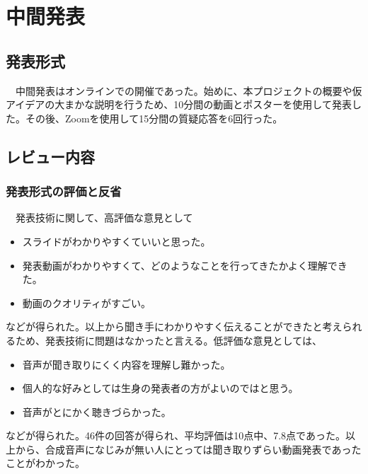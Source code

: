 \chapter{中間発表}

\section{発表形式}
　中間発表はオンラインでの開催であった。始めに、本プロジェクトの概要や仮アイデアの大まかな説明を行うため、10分間の動画とポスターを使用して発表した。その後、Zoomを使用して15分間の質疑応答を6回行った。

\section{レビュー内容}
\subsection{発表形式の評価と反省}
　発表技術に関して、高評価な意見として
\begin{itemize}
    \item スライドがわかりやすくていいと思った。
    \item 発表動画がわかりやすくて、どのようなことを行ってきたかよく理解できた。
    \item 動画のクオリティがすごい。
\end{itemize}
などが得られた。以上から聞き手にわかりやすく伝えることができたと考えられるため、発表技術に問題はなかったと言える。低評価な意見としては、
\begin{itemize}
    \item 音声が聞き取りにくく内容を理解し難かった。
    \item 個人的な好みとしては生身の発表者の方がよいのではと思う。
    \item 音声がとにかく聴きづらかった。
\end{itemize}
などが得られた。46件の回答が得られ、平均評価は10点中、7.8点であった。以上から、合成音声になじみが無い人にとっては聞き取りずらい動画発表であったことがわかった。

